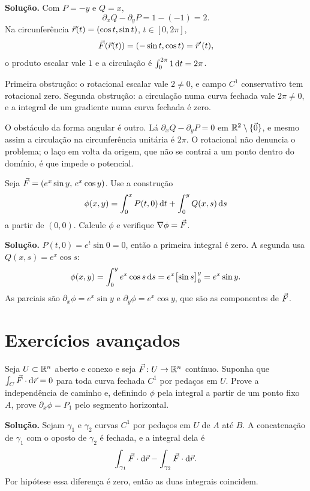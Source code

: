 \documentclass[11pt,a4paper]{article}
\begin{document}
\noindent\textbf{Solução.}
Com $P=-y$ e $Q=x$,
\[
\partial_x Q-\partial_y P=1-(-1)=2.
\]
Na circunferência $\vec{r}(t)=(\cos t,\sin t)$, $t\in[0,2\pi]$,
\[
\vec{F}(\vec{r}(t))=(-\sin t,\cos t)=\vec{r}'(t),
\]
o produto escalar vale $1$ e a circulação é $\int_0^{2\pi}1\,\mathrm{d} t=2\pi$.

Primeira obstrução: o rotacional escalar vale $2\neq 0$, e campo $C^1$ conservativo tem rotacional zero. Segunda obstrução: a circulação numa curva fechada vale $2\pi\neq 0$, e a integral de um gradiente numa curva fechada é zero.

O obstáculo da forma angular é outro. Lá $\partial_x Q-\partial_y P=0$ em $\mathbb{R}^2\setminus\{\vec{0}\}$, e mesmo assim a circulação na circunferência unitária é $2\pi$. O rotacional não denuncia o problema; o laço em volta da origem, que não se contrai a um ponto dentro do domínio, é que impede o potencial.

\begin{exercicio}
Seja $\vec{F}=(e^x\sin y,\, e^x\cos y)$. Use a construção
\[
\phi(x,y)=\int_0^x P(t,0)\,\mathrm{d} t+\int_0^y Q(x,s)\,\mathrm{d} s
\]
a partir de $(0,0)$. Calcule $\phi$ e verifique $\nabla\phi=\vec{F}$.
\end{exercicio}

\noindent\textbf{Solução.}
$P(t,0)=e^t\sin 0=0$, então a primeira integral é zero. A segunda usa $Q(x,s)=e^x\cos s$:
\[
\phi(x,y)=\int_0^y e^x\cos s\,\mathrm{d} s=e^x\bigl[\sin s\bigr]_0^y=e^x\sin y.
\]
As parciais são $\partial_x\phi=e^x\sin y$ e $\partial_y\phi=e^x\cos y$, que são as componentes de $\vec{F}$.

\section{Exercícios avançados}

\begin{exercicio}
Seja $U\subset\mathbb{R}^n$ aberto e conexo e seja $\vec{F}\colon U\to\mathbb{R}^n$ contínuo. Suponha que $\int_C\vec{F}\cdot\mathrm{d}\vec{r}=0$ para toda curva fechada $C^1$ por pedaços em $U$. Prove a independência de caminho e, definindo $\phi$ pela integral a partir de um ponto fixo $A$, prove $\partial_x\phi=P_1$ pelo segmento horizontal.
\end{exercicio}

\noindent\textbf{Solução.}
Sejam $\gamma_1$ e $\gamma_2$ curvas $C^1$ por pedaços em $U$ de $A$ até $B$. A concatenação de $\gamma_1$ com o oposto de $\gamma_2$ é fechada, e a integral dela é
\[
\int_{\gamma_1}\vec{F}\cdot\mathrm{d}\vec{r}-\int_{\gamma_2}\vec{F}\cdot\mathrm{d}\vec{r}.
\]
Por hipótese essa diferença é zero, então as duas integrais coincidem.
\end{document}
